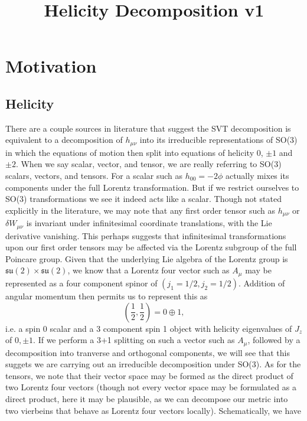 \documentclass[10pt,letterpaper]{article}
\title{Helicity Decomposition v1}
\author{}
\date{}
\numberwithin{equation}{subsection}
\begin{document}
\maketitle
\tableofcontents
\newpage
\section{Motivation}
\subsection{Helicity}
There are a couple sources in literature that suggest the SVT decomposition is equivalent to a decomposition of $h_{\mu\nu}$ into its irreducible representations of SO(3) in which the equations of motion then split into equations of helicity 0, $\pm1$ and $\pm 2$. When we say scalar, vector, and tensor, we are really referring to SO(3) scalars, vectors, and tensors. For a scalar such as $h_{00} = -2\phi$ actually mixes its components under the full Lorentz transformation. But if we restrict ourselves to SO(3) transformations we see it indeed acts like a scalar. Though not stated explicitly in the literature, we may note that any first order tensor such as $h_{\mu\nu}$ or $\delta W_{\mu\nu}$ is invariant under infinitesimal coordinate translations, with the Lie derivative vanishing. This perhaps suggests that infinitesimal transformations upon our first order tensors may be affected via the Lorentz subgroup of the full Poincare group. Given that the underlying Lie algebra of the Lorentz group is $\mathfrak {su}(2)\times\mathfrak {su}(2)$, we know that a Lorentz four vector such as $A_{\mu}$ may be represented as a four component spinor of $(j_1=1/2,j_2 = 1/2)$. Addition of angular momentum then permits us to represent this as
\begin{equation}
\left( \frac12,\frac 12\right ) = 0 \oplus 1,
\end{equation}
i.e. a spin 0 scalar and a 3 component spin 1 object with helicity eigenvalues of $J_z$ of $0, \pm1$. If we perform a 3+1 splitting on such a vector such as $A_{\mu}$, followed by a decomposition into tranverse and orthogonal components, we will see that this suggets we are carrying out an irreducible decomposition under SO(3). As for the tensors, we note that their vector space may be formed as the direct product of two Lorentz four vectors (though not every vector space may be formulated as a direct product, here it may be plausible, as we can decompose our metric into two vierbeins that behave as Lorentz four vectors locally). Schematically, we have
\end{document}
